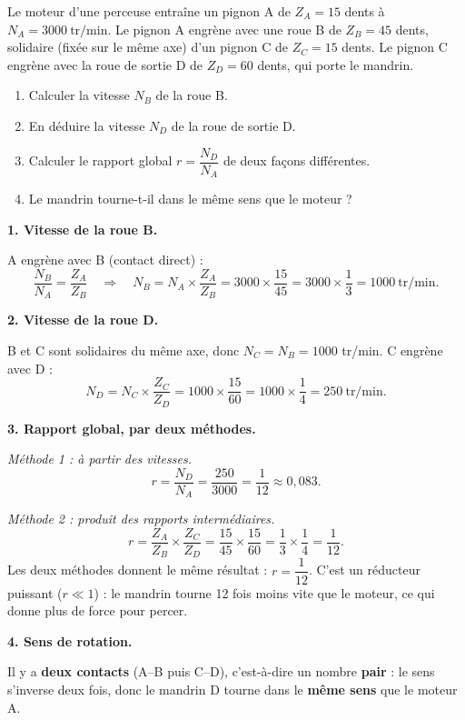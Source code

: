 \documentclass[11pt]{article}
\begin{document}
\begin{exoresolu}
Le moteur d'une perceuse entraîne un pignon A de $Z_A = 15$ dents à $N_A = \SI{3000}{\text{tr/min}}$. Le pignon A engrène avec une roue B de $Z_B = 45$ dents, solidaire (fixée sur le même axe) d'un pignon C de $Z_C = 15$ dents. Le pignon C engrène avec la roue de sortie D de $Z_D = 60$ dents, qui porte le mandrin.
\begin{enumerate}
\item Calculer la vitesse $N_B$ de la roue B.
\item En déduire la vitesse $N_D$ de la roue de sortie D.
\item Calculer le rapport global $r = \dfrac{N_D}{N_A}$ de deux façons différentes.
\item Le mandrin tourne-t-il dans le même sens que le moteur ?
\end{enumerate}
\tcblower
\textbf{1. Vitesse de la roue B.}

A engrène avec B (contact direct) :
\[ \frac{N_B}{N_A} = \frac{Z_A}{Z_B} \quad \Rightarrow \quad N_B = N_A \times \frac{Z_A}{Z_B} = 3000 \times \frac{15}{45} = 3000 \times \frac{1}{3} = 1000\ \text{tr/min}. \]

\textbf{2. Vitesse de la roue D.}

B et C sont solidaires du même axe, donc $N_C = N_B = 1000$ tr/min. C engrène avec D :
\[ N_D = N_C \times \frac{Z_C}{Z_D} = 1000 \times \frac{15}{60} = 1000 \times \frac{1}{4} = 250\ \text{tr/min}. \]

\textbf{3. Rapport global, par deux méthodes.}

\textit{Méthode 1 : à partir des vitesses.}
\[ r = \frac{N_D}{N_A} = \frac{250}{3000} = \frac{1}{12} \approx 0,083. \]

\textit{Méthode 2 : produit des rapports intermédiaires.}
\[ r = \frac{Z_A}{Z_B} \times \frac{Z_C}{Z_D} = \frac{15}{45} \times \frac{15}{60} = \frac{1}{3} \times \frac{1}{4} = \frac{1}{12}. \]
Les deux méthodes donnent le même résultat : $r = \dfrac{1}{12}$. C'est un réducteur puissant ($r \ll 1$) : le mandrin tourne 12 fois moins vite que le moteur, ce qui donne plus de force pour percer.

\textbf{4. Sens de rotation.}

Il y a \textbf{deux contacts} (A--B puis C--D), c'est-à-dire un nombre \textbf{pair} : le sens s'inverse deux fois, donc le mandrin D tourne dans le \textbf{même sens} que le moteur A.
\end{exoresolu}
\end{document}
